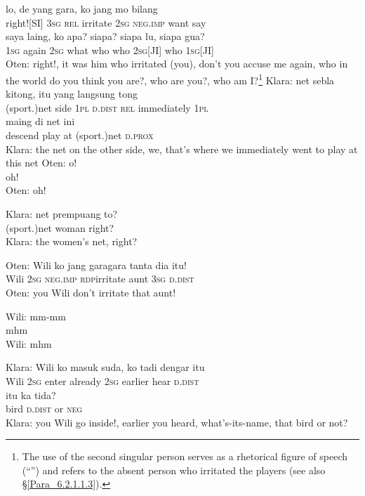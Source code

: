 \ea
{}    {lo,}    {de}    {yang}    {gara,}   ko    {jang}   mo   bilang\\
   {}    {right![SI]}    {\textsc{3sg}}    {\textsc{rel}}    {irritate}   \textsc{2sg}    {\textsc{neg.imp}}   want   say\\
\gll saya    {laing,}    {ko}    {apa?}    {siapa?}   siapa    {lu,}   siapa    {gua?}\\
  \textsc{1sg}    {again}    {\textsc{2sg}}    {what}    {who}   who    {\textsc{2sg}[JI]}   who    {\textsc{1sg}[JI]}\\
\glt
Oten: right!, it was him who irritated (you), don’t you accuse me again, who in the world do you think you are?, who are you?, who am I?\footnote{The use of the second singular person serves as a rhetorical figure of speech (“”) and refers to the absent person who irritated the players (see also §\ref{Para_6.2.1.1.3}).}
\z
\ea
\gll   Klara:    {net}    {sebla}    {kitong,}   itu   yang   langsung   tong\\
 {}     {(sport.)net}    {side}    {\textsc{1pl}}   \textsc{d.dist}   \textsc{rel}   immediately   \textsc{1pl}\\
   maing    {di}    {net}    {ini}\\
   {descend}   play    {at}    {(sport.)net}    {\textsc{d.prox}}\\
\glt
Klara: the net on the other side, we, that’s where we immediately went to play at this net
\z
\ea
\gll   Oten:   o!\\
  {}   oh!\\
\glt
Oten: oh!
\z

\ea
\gll   Klara:   net   prempuang   to?\\
 {}    (sport.)net   woman   right?\\
\glt
Klara: the women’s net, right?
\z

\ea
\gll   Oten:   Wili   ko   jang   gara{\Tilde}gara   tanta   dia   itu!\\
 {}  Wili   \textsc{2sg}   \textsc{neg.imp}   \textsc{rdp}{\Tilde}irritate   aunt   \textsc{3sg}   \textsc{d.dist}\\
\glt
Oten: you Wili don’t irritate that aunt!
\z

\ea
\gll   Wili:   mm-mm\\
{}     mhm\\
\glt
Wili: mhm
\z

\ea
\gll   Klara:    {Wili}    {ko}    {masuk}   suda,   ko   tadi   dengar   itu\\
{}      {Wili}    {\textsc{2sg}}    {enter}   already   \textsc{2sg}   earlier   hear   \textsc{d.dist}\\
    {itu}    {ka}    {tida?}\\
   {bird}    {\textsc{d.dist}}    {or}    {\textsc{neg}}\\
\glt
Klara: you Wili go inside!, earlier you heard, what’s-its-name, that bird or not?
\z

